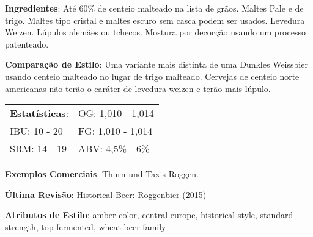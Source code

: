 \textbf{Ingredientes}: Até 60\% de centeio malteado na lista de grãos. Maltes Pale e de trigo. Maltes tipo cristal e maltes escuro sem casca podem ser usados. Levedura Weizen. Lúpulos alemães ou tchecos. Mostura por decocção usando um processo patenteado.

\textbf{Comparação de Estilo}: Uma variante mais distinta de uma Dunkles Weissbier usando centeio malteado no lugar de trigo malteado. Cervejas de centeio norte americanas não terão o caráter de levedura weizen e terão mais lúpulo.

\begin{tabular}{@{}p{35mm}p{35mm}@{}}
  \textbf{Estatísticas}: & OG: 1,010 - 1,014  \\
  IBU: 10 - 20  & FG: 1,010 - 1,014  \\
  SRM: 14 - 19 & ABV: 4,5\% - 6\%
\end{tabular}

\textbf{Exemplos Comerciais}: Thurn und Taxis Roggen.

\textbf{Última Revisão}: Historical Beer: Roggenbier (2015)

\textbf{Atributos de Estilo}: amber-color, central-europe, historical-style, standard-strength, top-fermented, wheat-beer-family
